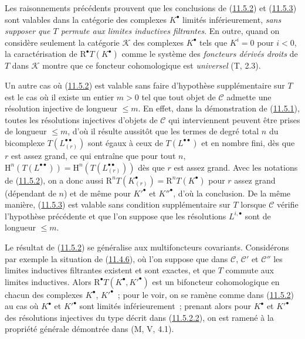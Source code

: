 \begin{remark}[11.5.4]
\label{0.11.5.4-fr}
Les raisonnements précédents prouvent que les conclusions de
(\hyperref[0.11.5.2-fr]{11.5.2}) et
(\hyperref[0.11.5.3-fr]{11.5.3}) sont valables dans la catégorie des
complexes $K^\bullet$ limités inférieurement, \emph{sans supposer que $T$
permute aux limites inductives filtrantes}. En outre, quand on considère
seulement la catégorie $\mathcal K$ des complexes $K^\bullet$ tels que
$K^i=0$ pour $i<0$, la caractérisation de $\mathrm R^\bullet T(K^\bullet)$
comme le système des \emph{foncteurs dérivés droits} de $T$ dans $\mathcal K$
montre que ce foncteur cohomologique est \emph{universel} (T, 2.3).

Un autre cas où (\hyperref[0.11.5.2-fr]{11.5.2}) est valable sans faire
d'hypothèse supplémentaire sur $T$ est le cas où il existe un entier $m>0$
tel que tout objet de $\mathcal C$ admette une résolution injective de longueur
$\leq m$. En effet, dans la démonstration de
(\hyperref[0.11.5.1-fr]{11.5.1}), toutes les résolutions injectives d'objets
de $\mathcal C$ qui interviennent peuvent être prises de longueur $\leq m$,
d'où il résulte aussitôt que les termes de degré total $n$ du bicomplexe
$T(L_{(r)}^{\bullet\bullet})$ sont égaux à ceux de
$T(L^{\bullet\bullet})$ et en nombre fini, dès que $r$ est assez grand, ce qui
entraîne que pour tout $n$,
$\mathrm H^n(T(L^{\bullet\bullet}))=
\mathrm H^n(T(L_{(r)}^{\bullet\bullet}))$ dès que $r$ est assez grand. Avec
les notations de (\hyperref[0.11.5.2-fr]{11.5.2}), on a donc aussi
$\mathrm R^nT(K_{(r)}^\bullet)=\mathrm R^nT(K^\bullet)$ pour $r$ assez grand
(dépendant de $n$) et de même pour $K'^\bullet$ et $K''^\bullet$, d'où la
conclusion. De la même manière, (\hyperref[0.11.5.3-fr]{11.5.3}) est valable
sans condition supplémentaire sur $T$ lorsque $\mathcal C$ vérifie
l'hypothèse précédente et que l'on suppose que les résolutions
$L^{i,\bullet}$ sont de longueur $\leq m$.
\end{remark}

\begin{env}[11.5.5]
\label{0.11.5.5-fr}
Le résultat de (\hyperref[0.11.5.2-fr]{11.5.2}) se généralise aux
multifoncteurs covariants. Considérons par exemple la situation de
(\hyperref[0.11.4.6-fr]{11.4.6}), où l'on suppose que dans $\mathcal C$,
$\mathcal C'$ et $\mathcal C''$
les limites inductives filtrantes existent et sont exactes, et que $T$ commute
aux limites inductives. Alors $\mathrm R^\bullet T(K^\bullet,K'^\bullet)$ est
un bifoncteur cohomologique en chacun des complexes $K^\bullet$,
$K'^\bullet$~; pour le voir, on se ramène comme dans
(\hyperref[0.11.5.2-fr]{11.5.2}) au cas où $K^\bullet$ et $K'^\bullet$ sont
limités inférieurement~; prenant alors pour $K^\bullet$ et $K'^\bullet$ des
résolutions injectives du type décrit dans
(\hyperref[0.11.5.2.2-fr]{11.5.2.2}), on est ramené à la propriété générale
démontrée dans (M, V, 4.1).
\end{env}

